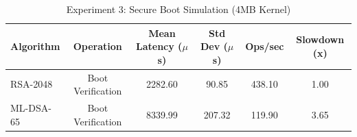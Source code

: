 \begin{table}
\caption{Experiment 3: Secure Boot Simulation (4MB Kernel)}
\label{tab:exp3}
\begin{tabular}{lccccc}
\toprule
Algorithm & Operation & Mean Latency ($\mu$s) & Std Dev ($\mu$s) & Ops/sec & Slowdown (x) \\
\midrule
RSA-2048 & Boot Verification & 2282.60 & 90.85 & 438.10 & 1.00 \\
ML-DSA-65 & Boot Verification & 8339.99 & 207.32 & 119.90 & 3.65 \\
\bottomrule
\end{tabular}
\end{table}
